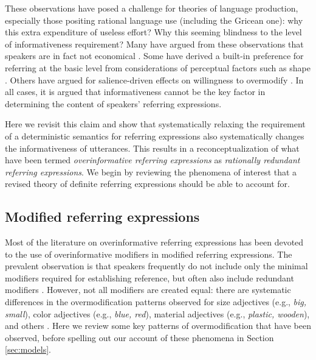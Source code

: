 \documentclass[11pt]{article}
\newcommand{\sectionref}[1]{Section \ref{#1}}
\begin{document}
These observations have posed a challenge for theories of language production, especially those positing rational language use (including the Gricean one): why this extra expenditure of useless effort? Why this seeming blindness to the level of informativeness requirement? Many have argued from these observations that speakers are in fact not economical \cite{Engelhardt2006, Pechmann1989}. Some have derived a built-in preference for referring at the basic level from considerations of perceptual factors such as shape \cite{Rosch1976, Rosch1973, murphy1982basic}. Others have argued for salience-driven effects on willingness to overmodify \cite{Gatt2014, Westerbeek2015}. In all cases, it is argued that informativeness cannot be the key factor in determining the content of speakers' referring expressions. 

Here we revisit this claim and show that systematically relaxing the requirement of a deterministic semantics for referring expressions also systematically changes the informativeness of utterances. This results in a reconceptualization of what have been termed \emph{overinformative referring expressions} as \emph{rationally redundant referring expressions}. We begin by reviewing the phenomena of interest that a revised theory of definite referring expressions should be able to account for. 

\subsection{Modified referring expressions}
\label{sec:modified}


Most of the literature on overinformative referring expressions has been devoted to the use of overinformative modifiers in modified referring expressions. The prevalent observation is that speakers frequently do not include only the minimal modifiers required for establishing reference, but often also include redundant modifiers \cite{Pechmann1989, nadig2002, Maes2004, Engelhardt2006, Arts2011, Koolen2011}. However, not all modifiers are created equal: there are systematic differences in the overmodification patterns observed for size adjectives (e.g., \emph{big, small}), color adjectives (e.g., \emph{blue, red}), material adjectives (e.g., \emph{plastic, wooden}), and others \cite{sedivy2003a}. Here we review some key patterns of overmodification that have been observed, before spelling out our account of these phenomena in \sectionref{sec:models}.
\end{document}
